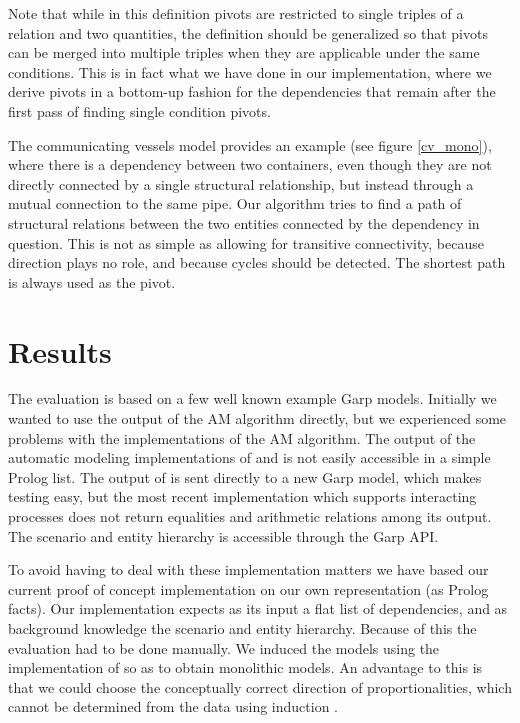 \documentclass{article} %
\begin{document}
Note that while in this definition pivots are restricted to single triples of a
relation and two quantities, the definition should be generalized so that
pivots can be merged into multiple triples when they are applicable under the
same conditions. This is in fact what we have done in our implementation,
where we derive pivots in a bottom-up fashion for the dependencies that remain
after the first pass of finding single condition pivots.

The communicating vessels model provides an example (see figure \ref{cv_mono}),
where there is a dependency between two containers, even though they are not
directly connected by a single structural relationship, but instead through
a mutual connection to the same pipe. Our algorithm tries to find a path of
structural relations between the two entities connected by the dependency in
question. This is not as simple as allowing for transitive connectivity,
because direction plays no role, and because cycles should be detected. The
shortest path is always used as the pivot.

\section{Results}
\label{sec:results}
The evaluation is based on a few well known example Garp models. Initially
we wanted to use the output of the AM algorithm directly, but we experienced
some problems with the implementations of the AM algorithm.  The output of the
automatic modeling implementations of \cite{buisman} and
\cite{vanweelden} is not easily accessible in a simple Prolog list. The output
of \cite{buisman} is sent directly to a new Garp model, which makes testing
easy, but the most recent implementation \cite{vanweelden} which supports
interacting processes does not return equalities and arithmetic relations among
its output. The scenario and entity hierarchy is accessible through the Garp
API.

To avoid having to deal with these implementation matters we have based our
current proof of concept implementation on our own representation (as Prolog
facts). Our implementation expects as its input a flat list of dependencies,
and as background knowledge the scenario and entity hierarchy. Because of this
the evaluation had to be done manually. We induced the models using the
implementation of \cite{buisman} so as to obtain monolithic models. An
advantage to this is that we could choose the conceptually correct direction of
proportionalities, which cannot be determined from the data using induction
\cite{vanweelden}.
\end{document}
